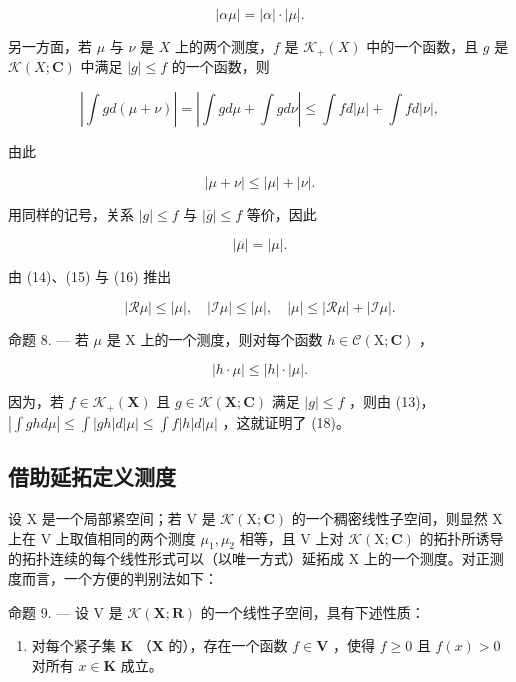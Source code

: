 \[
| \alpha \mu | = | \alpha | \cdot | \mu |.\tag{14}
\]

另一方面，若 \(\mu\) 与 \(\nu\) 是 \(X\) 上的两个测度，\(f\) 是 \(\mathcal{K}_{+}(X)\) 中的一个函数，且 \(g\) 是 \(\mathcal{K}(X; \mathbf{C})\) 中满足 \(|g| \leqslant f\) 的一个函数，则

\[
\left| \int g d (\mu + \nu) \right| = \left| \int g d \mu + \int g d \nu \right| \leqslant \int f d | \mu | + \int f d | \nu |,
\]

由此

\[
| \mu + \nu | \leqslant | \mu | + | \nu |.\tag{15}
\]

用同样的记号，关系 \(|g| \leqslant f\) 与 \(|\overline{g}| \leqslant f\) 等价，因此

\[
| \overline {{{\mu}}} | = | \mu |.\tag{16}
\]

由 (14)、(15) 与 (16) 推出

\[
| \mathcal {R} \mu | \leqslant | \mu |, \quad | \mathcal {I} \mu | \leqslant | \mu |, \quad | \mu | \leqslant | \mathcal {R} \mu | + | \mathcal {I} \mu |.\tag{17}
\]

命题 8. --- 若 \(\mu\) 是 X 上的一个测度，则对每个函数 \(h \in \mathcal{C}(\mathrm{X};\mathbf{C})\) ，

\[
\left| h \cdot \mu \right| \leqslant \left| h \right| \cdot \left| \mu \right|.\tag{18}
\]

因为，若 \(f \in \mathcal{K}_+(\mathbf{X})\) 且 \(g \in \mathcal{K}(\mathbf{X};\mathbf{C})\) 满足 \(|g| \leqslant f\) ，则由 (13)，\(|\int gh d\mu| \leqslant \int |gh| d|\mu| \leqslant \int f|h| d|\mu|\) ，这就证明了 (18)。

\subsection{借助延拓定义测度}

设 X 是一个局部紧空间；若 V 是 \(\mathcal{K}(\mathrm{X};\mathbf{C})\) 的一个稠密线性子空间，则显然 X 上在 V 上取值相同的两个测度 \(\mu_{1}, \mu_{2}\) 相等，且 V 上对 \(\mathcal{K}(\mathrm{X};\mathbf{C})\) 的拓扑所诱导的拓扑连续的每个线性形式可以（以唯一方式）延拓成 X 上的一个测度。对正测度而言，一个方便的判别法如下：

命题 9. --- 设 V 是 \(\mathcal{K}(\mathbf{X};\mathbf{R})\) 的一个线性子空间，具有下述性质：

\begin{enumerate}
\def\labelenumi{(\Alph{enumi})}
\setcounter{enumi}{15}
\tightlist
\item
  对每个紧子集 \(\mathbf{K}\) （\(\mathbf{X}\) 的），存在一个函数 \(f \in \mathbf{V}\) ，使得 \(f \geqslant 0\) 且 \(f(x) > 0\) 对所有 \(x \in \mathbf{K}\) 成立。
\end{enumerate}

